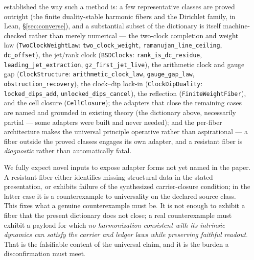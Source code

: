 \documentclass[11pt]{article}
\theoremstyle{definition}
\begin{document}
established the way such a method is: a few representative classes are proved outright (the finite
duality-stable harmonic fibers and the Dirichlet family, in Lean, \S\ref{sec:converse}), and a substantial
subset of the dictionary is itself machine-checked rather than merely numerical --- the two-clock
completion and weight law (\texttt{TwoClockWeightLaw}: \texttt{two\_clock\_weight},
\texttt{ramanujan\_line\_ceiling}, \texttt{dc\_offset}), the jet/rank clock (\texttt{BSDClocks}:
\texttt{rank\_is\_dc\_residue}, \texttt{leading\_jet\_extraction}, \texttt{gz\_first\_jet\_live}), the
arithmetic clock and gauge gap (\texttt{ClockStructure}: \texttt{arithmetic\_clock\_law},
\texttt{gauge\_gap\_law}, \texttt{obstruction\_recovery}), the clock--dip lock-in (\texttt{ClockDipDuality}:
\texttt{locked\_dips\_add}, \texttt{unlocked\_dips\_cancel}), the reflection (\texttt{FiniteWeightFiber}),
and the cell closure (\texttt{CellClosure}); the adapters that close the remaining cases are named and
grounded in existing theory (the dictionary above, necessarily partial --- some adapters were built and
never needed); and the per-fiber architecture makes the universal principle
operative rather than aspirational --- a fiber outside the proved classes engages its own adapter, and a resistant fiber is
\emph{diagnostic} rather than automatically fatal.

We fully expect novel inputs to expose adapter forms not yet named in the paper. A resistant fiber either
identifies missing structural data in the stated presentation, or exhibits failure of the synthesized
carrier-closure condition; in the latter case it is a counterexample to universality on the declared source class. This fixes what
a genuine counterexample must be. It is not enough to exhibit a fiber that the present dictionary does not
close; a real counterexample must exhibit a payload for which \emph{no harmonization consistent with its
intrinsic dynamics can satisfy the carrier and ledger laws while preserving faithful readout}. That is the
falsifiable content of the universal claim, and it is the burden a disconfirmation must meet.
\end{document}
